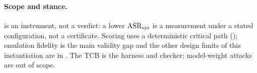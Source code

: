 \paragraph{Scope and stance.}
 is an instrument, not a verdict: a lower $\mathrm{ASR}_{\mathrm{sys}}$ is a measurement under a stated
configuration, not a certificate. Scoring uses a deterministic critical path
(); emulation fidelity is the main validity gap and the other
design limits of this instantiation are in . The TCB is the harness and
checker; model-weight attacks are out of scope.